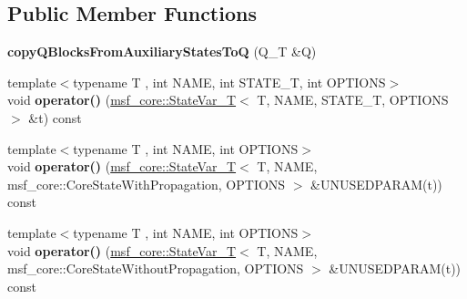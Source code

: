 \subsection*{Public Member Functions}
\begin{DoxyCompactItemize}
\item 
\hypertarget{structmsf__tmp_1_1copyQBlocksFromAuxiliaryStatesToQ_a7a9ed4001d97b216f44afa8990fa0e8b}{{\bfseries copy\-Q\-Blocks\-From\-Auxiliary\-States\-To\-Q} (Q\-\_\-\-T \&Q)}\label{structmsf__tmp_1_1copyQBlocksFromAuxiliaryStatesToQ_a7a9ed4001d97b216f44afa8990fa0e8b}

\item 
\hypertarget{structmsf__tmp_1_1copyQBlocksFromAuxiliaryStatesToQ_afeaa6786a0587a3737d69b3fa7f8de24}{{\footnotesize template$<$typename T , int N\-A\-M\-E, int S\-T\-A\-T\-E\-\_\-\-T, int O\-P\-T\-I\-O\-N\-S$>$ }\\void {\bfseries operator()} (\hyperlink{structmsf__core_1_1StateVar__T}{msf\-\_\-core\-::\-State\-Var\-\_\-\-T}$<$ T, N\-A\-M\-E, S\-T\-A\-T\-E\-\_\-\-T, O\-P\-T\-I\-O\-N\-S $>$ \&t) const }\label{structmsf__tmp_1_1copyQBlocksFromAuxiliaryStatesToQ_afeaa6786a0587a3737d69b3fa7f8de24}

\item 
\hypertarget{structmsf__tmp_1_1copyQBlocksFromAuxiliaryStatesToQ_a5cc910e367658a8d0e8439368a96327f}{{\footnotesize template$<$typename T , int N\-A\-M\-E, int O\-P\-T\-I\-O\-N\-S$>$ }\\void {\bfseries operator()} (\hyperlink{structmsf__core_1_1StateVar__T}{msf\-\_\-core\-::\-State\-Var\-\_\-\-T}$<$ T, N\-A\-M\-E, msf\-\_\-core\-::\-Core\-State\-With\-Propagation, O\-P\-T\-I\-O\-N\-S $>$ \&U\-N\-U\-S\-E\-D\-P\-A\-R\-A\-M(t)) const }\label{structmsf__tmp_1_1copyQBlocksFromAuxiliaryStatesToQ_a5cc910e367658a8d0e8439368a96327f}

\item 
\hypertarget{structmsf__tmp_1_1copyQBlocksFromAuxiliaryStatesToQ_abf3a1052628ff5e611a94115bfba7d47}{{\footnotesize template$<$typename T , int N\-A\-M\-E, int O\-P\-T\-I\-O\-N\-S$>$ }\\void {\bfseries operator()} (\hyperlink{structmsf__core_1_1StateVar__T}{msf\-\_\-core\-::\-State\-Var\-\_\-\-T}$<$ T, N\-A\-M\-E, msf\-\_\-core\-::\-Core\-State\-Without\-Propagation, O\-P\-T\-I\-O\-N\-S $>$ \&U\-N\-U\-S\-E\-D\-P\-A\-R\-A\-M(t)) const }\label{structmsf__tmp_1_1copyQBlocksFromAuxiliaryStatesToQ_abf3a1052628ff5e611a94115bfba7d47}

\end{DoxyCompactItemize}


